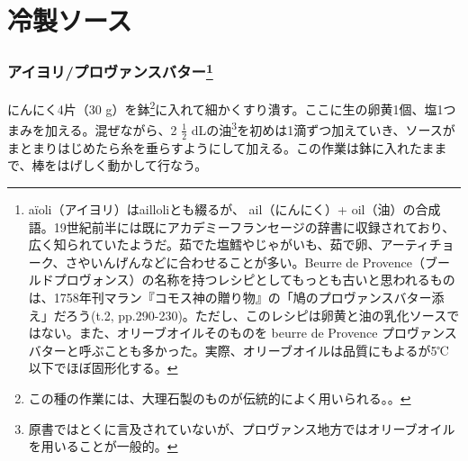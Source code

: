 \hypertarget{ux51b7ux88fdux30bdux30fcux30b9}{%
\section{冷製ソース}\label{ux51b7ux88fdux30bdux30fcux30b9}}


\begin{recette}


\hypertarget{sauce-aioli}{%
\subsubsection[アイヨリ/プロヴァンスバター]{\texorpdfstring{アイヨリ/プロヴァンスバター\footnote{aïoli（アイヨリ）はailloliとも綴るが、
  ail（にんにく）+
  oil（油）の合成語。19世紀前半には既にアカデミーフランセージの辞書に収録されており、広く知られていたようだ。茹でた塩鱈やじゃがいも、茹で卵、アーティチョーク、さやいんげんなどに合わせることが多い。Beurre
  de
  Provence（ブールドプロヴォンス）の名称を持つレシピとしてもっとも古いと思われるものは、1758年刊マラン『コモス神の贈り物』の「鳩のプロヴァンスバター添え」だろう(t.2,
  pp.290-230)。ただし、このレシピは卵黄と油の乳化ソースではない。また、オリーブオイルそのものを
  beurre de Provence
  プロヴァンスバターと呼ぶことも多かった。実際、オリーブオイルは品質にもよるが5℃以下でほぼ固形化する。}}{アイヨリ/プロヴァンスバター}}\label{sauce-aioli}}



にんにく4片（30 g）を鉢\footnote{この種の作業には、大理石製のものが伝統的によく用いられる。。}に入れて細かくすり潰す。ここに生の卵黄1個、塩1つまみを加える。混ぜながら、2
\(\frac{1}{2}\) dLの油\footnote{原書ではとくに言及されていないが、プロヴァンス地方ではオリーブオイルを用いることが一般的。}を初めは1滴ずつ加えていき、ソースがまとまりはじめたら糸を垂らすようにして加える。この作業は鉢に入れたままで、棒をはげしく動かして行なう。


\end{recette}
